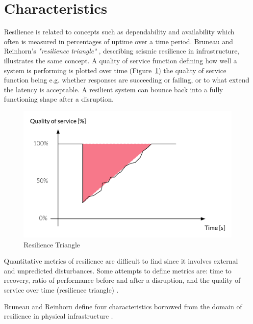 \section{Characteristics}
\noindent Resilience is related to concepts such as dependability and availability which often is measured in percentages of uptime over a time period. Bruneau and Reinhorn's \textit{"resilience triangle"} \cite[p. 21]{omer2013resilience}, describing seismic resilience in infrastructure, illustrates the same concept. A quality of service function defining how well a system is performing is plotted over time (Figure~\ref{fig:resilience_triangle}) the quality of service function being e.g. whether responses are succeeding or failing, or to what extend the latency is acceptable. A resilient system can bounce back into a fully functioning shape after a disruption.

\begin{figure}[H]
    \centering
    \includegraphics[width=12cm]{figures/resilience_triangle}
    \caption{Resilience Triangle}
    \label{fig:resilience_triangle}
\end{figure}

\noindent 
Quantitative metrics of resilience are difficult to find since it involves external and unpredicted disturbances. Some attempts to define metrics are: time to recovery, ratio of performance before and after a disruption, and the quality of service over time (resilience triangle) \cite[p. 21-22]{omer2013resilience}.

\noindent
Bruneau and Reinhorn define four characteristics borrowed from the domain of resilience in physical infrastructure \cite[p. 2]{bruneau_2007_seismic_resilience}.


